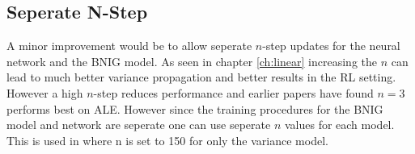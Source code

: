 \subsection{Seperate N-Step}

A minor improvement would be to allow seperate $n$-step updates for the neural network and the BNIG model. As seen in chapter \ref{ch:linear} increasing the $n$ can lead to much better variance propagation and better results in the RL setting. However a high $n$-step reduces performance and earlier papers have found $n=3$ performs best on ALE\citep{hessel_2017}. However since the training procedures for the BNIG model and network are seperate one can use seperate $n$ values for each model. This is used in \cite{donoghue_2017} where n is set to 150 for only the variance model.

\cleardoublepage